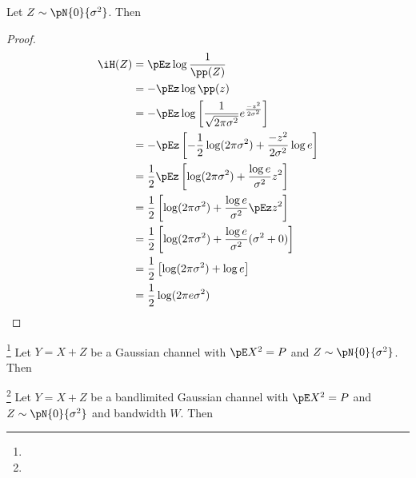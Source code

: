 \begin{theorem}
Let $Z\sim\pN{0}{\sigma^2}$. Then
\end{theorem}
\begin{proof}
\begin{align*}
  \iH(Z)
    &= \pEz \log \frac{1}{\pp(Z)}
  \\&= -\pEz \log \pp(z) 
  \\&= -\pEz
        \log \left[\frac{1}{\sqrt{2\pi\sigma^2}}e^{\frac{-z^2}{2\sigma^2}} \right] 
  \\&= -\pEz \left[
       -\frac{1}{2}\log(2\pi\sigma^2) 
       + \frac{-z^2}{2\sigma^2} \log e 
       \right] 
  \\&= \frac{1}{2} \pEz \left[
       \log(2\pi\sigma^2) 
       + \frac{\log e}{\sigma^2}z^2  
       \right] 
  \\&= \frac{1}{2} \left[
       \log(2\pi\sigma^2) + \frac{\log e}{\sigma^2}\pEz z^2  
       \right] 
  \\&= \frac{1}{2} \left[
       \log(2\pi\sigma^2) + \frac{\log e}{\sigma^2}(\sigma^2+0)
       \right] 
  \\&= \frac{1}{2} \left[
       \log(2\pi\sigma^2) + \log e
       \right] 
  \\&= \frac{1}{2} \log(2\pi e\sigma^2) 
\end{align*}
\end{proof}

\begin{theorem}
\footnote{
  }
Let $Y=X+Z$ be a Gaussian channel with $\pE X^2=P$ and
$Z\sim\pN{0}{\sigma^2}$. Then
\end{theorem}

\begin{theorem}
\footnote{
  }
Let $Y=X+Z$ be a bandlimited Gaussian channel with $\pE X^2=P$ and
$Z\sim\pN{0}{\sigma^2}$ and bandwidth $W$. Then
\end{theorem}
%




